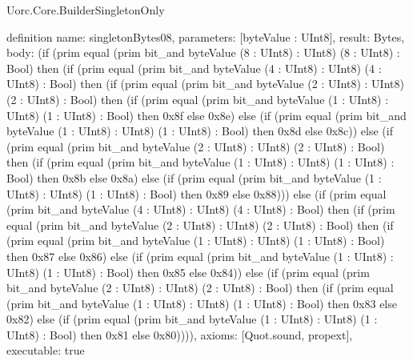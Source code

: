 \begin{lexlean}{Uorc.Core.BuilderSingletonOnly}
\begin{semanticmodule}
definition{
  name: singletonBytes08,
  parameters: [byteValue : UInt8],
  result: Bytes,
  body: (if (prim equal (prim bit_and byteValue (8 : UInt8) : UInt8) (8 : UInt8) : Bool) then (if (prim equal (prim bit_and byteValue (4 : UInt8) : UInt8) (4 : UInt8) : Bool) then (if (prim equal (prim bit_and byteValue (2 : UInt8) : UInt8) (2 : UInt8) : Bool) then (if (prim equal (prim bit_and byteValue (1 : UInt8) : UInt8) (1 : UInt8) : Bool) then 0x8f else 0x8e) else (if (prim equal (prim bit_and byteValue (1 : UInt8) : UInt8) (1 : UInt8) : Bool) then 0x8d else 0x8c)) else (if (prim equal (prim bit_and byteValue (2 : UInt8) : UInt8) (2 : UInt8) : Bool) then (if (prim equal (prim bit_and byteValue (1 : UInt8) : UInt8) (1 : UInt8) : Bool) then 0x8b else 0x8a) else (if (prim equal (prim bit_and byteValue (1 : UInt8) : UInt8) (1 : UInt8) : Bool) then 0x89 else 0x88))) else (if (prim equal (prim bit_and byteValue (4 : UInt8) : UInt8) (4 : UInt8) : Bool) then (if (prim equal (prim bit_and byteValue (2 : UInt8) : UInt8) (2 : UInt8) : Bool) then (if (prim equal (prim bit_and byteValue (1 : UInt8) : UInt8) (1 : UInt8) : Bool) then 0x87 else 0x86) else (if (prim equal (prim bit_and byteValue (1 : UInt8) : UInt8) (1 : UInt8) : Bool) then 0x85 else 0x84)) else (if (prim equal (prim bit_and byteValue (2 : UInt8) : UInt8) (2 : UInt8) : Bool) then (if (prim equal (prim bit_and byteValue (1 : UInt8) : UInt8) (1 : UInt8) : Bool) then 0x83 else 0x82) else (if (prim equal (prim bit_and byteValue (1 : UInt8) : UInt8) (1 : UInt8) : Bool) then 0x81 else 0x80)))),
  axioms: [Quot.sound, propext],
  executable: true
}


\end{semanticmodule}
\end{lexlean}
